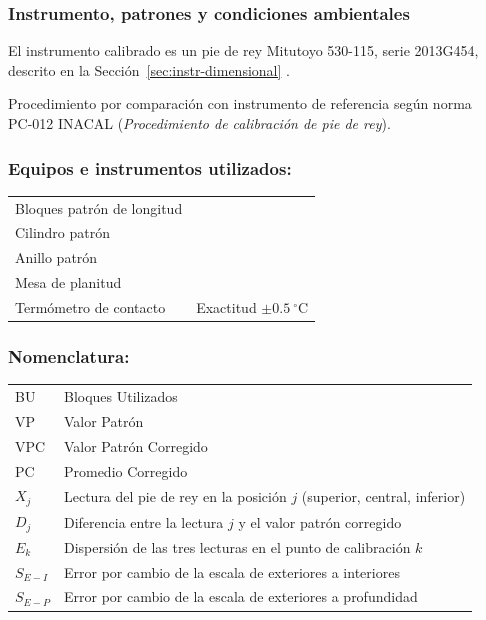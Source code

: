\subsubsection{Instrumento, patrones y condiciones ambientales}

El instrumento calibrado es un pie de rey Mitutoyo 530-115, serie 2013G454,
descrito en la Sección~\ref{sec:instr-dimensional}
\parencite{mitutoyo_530_115}.

\vspace{6pt}
Procedimiento por comparación con instrumento de referencia según norma\\
PC-012 INACAL \parencite{inacal_pc012} (\textit{Procedimiento de calibración de pie
de rey}).

\vspace{12pt}
\subsubsection*{Equipos e instrumentos utilizados:}
\begin{tabular}{ll}
Bloques patrón de longitud & \\[3pt]
Cilindro patrón            & \\[3pt]
Anillo patrón              & \\[3pt]
Mesa de planitud           & \\[3pt]
Termómetro de contacto     & Exactitud $\pm 0.5\ ^\circ\text{C}$
\end{tabular}

\vspace{12pt}
\subsubsection*{Nomenclatura:}
\begin{tabular}{ll}
BU  & Bloques Utilizados\\[3pt]
VP  & Valor Patrón\\[3pt]
VPC & Valor Patrón Corregido\\[3pt]
PC  & Promedio Corregido\\[3pt]
$X_j$ & Lectura del pie de rey en la posición $j$ (superior, central, inferior)\\[3pt]
$D_j$ & Diferencia entre la lectura $j$ y el valor patrón corregido\\[3pt]
$E_k$ & Dispersión de las tres lecturas en el punto de calibración $k$\\[3pt]
$S_{E-I}$ & Error por cambio de la escala de exteriores a interiores\\[3pt]
$S_{E-P}$ & Error por cambio de la escala de exteriores a profundidad
\end{tabular}

